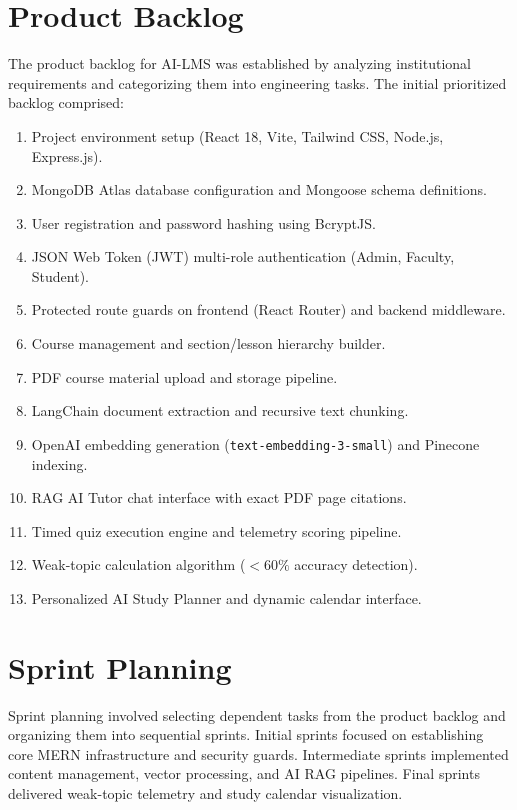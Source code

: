 \section{Product Backlog}

The product backlog for AI-LMS was established by analyzing institutional requirements and categorizing them into engineering tasks. The initial prioritized backlog comprised:

\begin{enumerate}
    \item Project environment setup (React 18, Vite, Tailwind CSS, Node.js, Express.js).
    \item MongoDB Atlas database configuration and Mongoose schema definitions.
    \item User registration and password hashing using BcryptJS.
    \item JSON Web Token (JWT) multi-role authentication (Admin, Faculty, Student).
    \item Protected route guards on frontend (React Router) and backend middleware.
    \item Course management and section/lesson hierarchy builder.
    \item PDF course material upload and storage pipeline.
    \item LangChain document extraction and recursive text chunking.
    \item OpenAI embedding generation (\texttt{text-embedding-3-small}) and Pinecone indexing.
    \item RAG AI Tutor chat interface with exact PDF page citations.
    \item Timed quiz execution engine and telemetry scoring pipeline.
    \item Weak-topic calculation algorithm ($<60\%$ accuracy detection).
    \item Personalized AI Study Planner and dynamic calendar interface.
\end{enumerate}

\section{Sprint Planning}

Sprint planning involved selecting dependent tasks from the product backlog and organizing them into sequential sprints. Initial sprints focused on establishing core MERN infrastructure and security guards. Intermediate sprints implemented content management, vector processing, and AI RAG pipelines. Final sprints delivered weak-topic telemetry and study calendar visualization.

